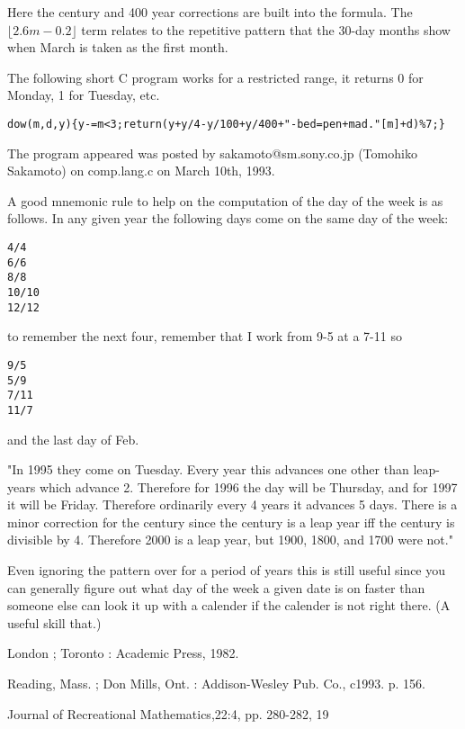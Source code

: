     Here the century and 400 year corrections are built into the formula.
    The $\lfloor 2.6m-0.2\rfloor$ term relates to the repetitive pattern that the 30-day
    months show when March is taken as the first month.

The following short C program works for a restricted range, it returns 0 for
Monday, 1 for Tuesday, etc.

\begin{verbatim}
dow(m,d,y){y-=m<3;return(y+y/4-y/100+y/400+"-bed=pen+mad."[m]+d)%7;}
\end{verbatim}

The program appeared  was posted by
sakamoto@sm.sony.co.jp (Tomohiko Sakamoto) on comp.lang.c on March
10th, 1993.


A good mnemonic rule to help on the computation of the day of the week is
as follows. In any given year the following days come on
the same day of the week:

\begin{verbatim}
4/4
6/6
8/8
10/10
12/12
\end{verbatim}

\noindent to remember the next four, remember that I work from 9-5 at a 7-11 so

\begin{verbatim}
9/5
5/9
7/11
11/7
\end{verbatim}

\noindent and the last day of Feb.

"In 1995 they come on Tuesday. Every year this advances one other than
leap-years which advance 2. Therefore for 1996 the day will be
Thursday, and for 1997 it will be Friday. Therefore ordinarily every 4
years it advances 5 days. There is a minor correction for the century
since the century is a leap year iff the century is divisible by 4.
Therefore 2000 is a leap year, but 1900, 1800, and 1700 were not."

Even ignoring the pattern over for a period of years this is still
useful since you can generally figure out what day of the week a given
date is on faster than someone else can look it up with a calender if
the calender is not right there. (A useful skill that.)



    \Ref

    {London ; Toronto : Academic Press, 1982.}


    {Reading, Mass. ; Don Mills, Ont. : Addison-Wesley Pub. Co., c1993. p. 156.}


    {Journal of Recreational Mathematics,}{22:4, pp. 280-282, 19}


